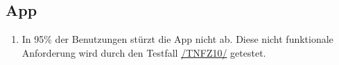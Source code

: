 \subsection*{App}

\begin{samepage}
    \begin{enumerate}[label=\textbf{/NFZ\arabic*0/}, align=left]
        \item \label{/NFZ10/} In 95\% der Benutzungen stürzt die App nicht ab. Diese nicht funktionale Anforderung wird durch den Testfall \hyperref[/TNFZ10/]{/TNFZ10/} getestet.
    \end{enumerate}
\end{samepage}